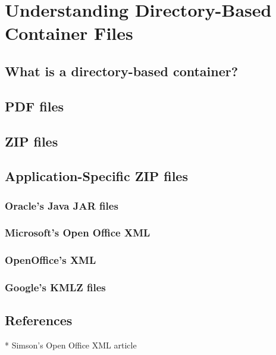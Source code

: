 \chapter{Understanding Directory-Based Container Files}
\section{What is a directory-based container?}
\section{PDF files}
\section{ZIP files}
\section{Application-Specific ZIP files}
\subsection{Oracle's Java JAR files}
\subsection{Microsoft's Open Office XML}
\subsection{OpenOffice's XML}
\subsection{Google's KMLZ files}
\section{References}
* Simson's Open Office XML article

